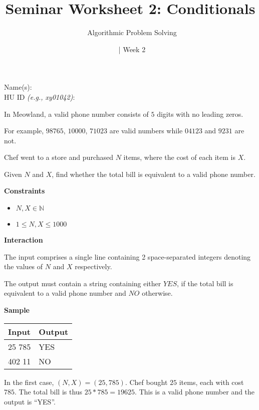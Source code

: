 \documentclass[a4paper]{exam}
\title{Seminar Worksheet 2: Conditionals}
\author{\class\ Algorithmic Problem Solving}
\date{\term\ | Week 2}
\newcommand\heading[1]{\textbf{#1}}
\begin{document}
\maketitle

Name(s): \hrulefill\\[5pt]
HU ID \textit{\small(e.g., xy01042)}: \hrulefill\\

\begin{questions}


    In Meowland, a valid phone number consists of $5$ digits with no leading zeros.

    For example, $98765$, $10000$, $71023$ are valid numbers while $04123$ and $9231$ are not.

    Chef went to a store and purchased $N$ items, where the cost of each item is $X$.

    Given $N$ and $X$, find whether the total bill is equivalent to a valid phone number.

    \heading{Constraints}
    \begin{itemize}
        \item $N,X \in \mathbb{N}$
        \item $1 \le N,X \le 1000$
    \end{itemize}

    \heading{Interaction}

    The input comprises a single line containing 2 space-separated integers denoting the values of $N$ and $X$ respectively.

    The output must contain a string containing either $YES$, if the total bill is equivalent to a valid phone number and $NO$ otherwise.

    \heading{Sample}

    \begin{tabularx}{\textwidth}{|X|X|}
        \rowcolor{gray!50}
        \hline
        Input  & Output \\ \hline\hline
        25 785 & YES    \\\hline
        402 11 & NO     \\\hline
    \end{tabularx}

    In the first case, $(N,X)=(25,785)$. Chef bought $25$ items, each with cost $785$. The total bill is thus $25 * 785 = 19625$. This is a valid phone number and the output is ``YES''.


\end{questions}
\end{document}

